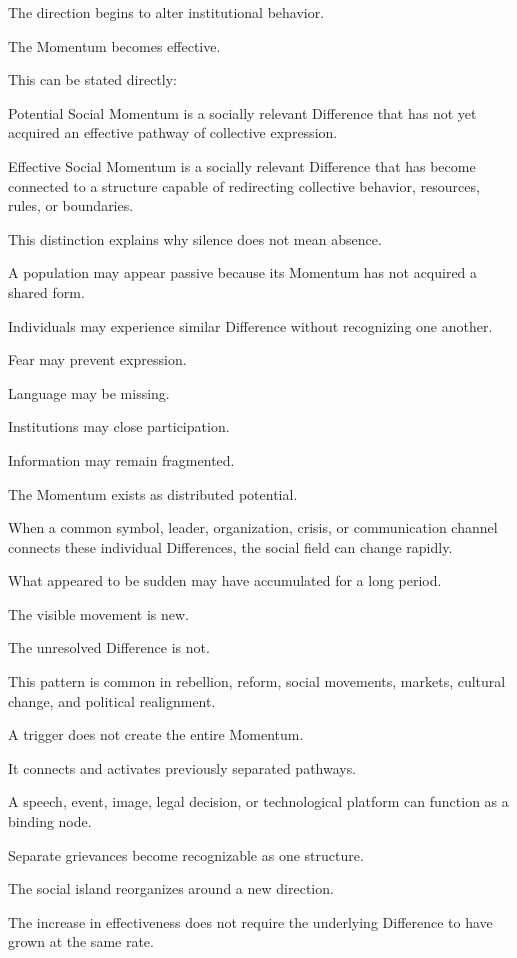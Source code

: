 The direction begins to alter institutional behavior.

The Momentum becomes effective.

This can be stated directly:

Potential Social Momentum is a socially relevant Difference that has not yet acquired an effective pathway of collective expression.

Effective Social Momentum is a socially relevant Difference that has become connected to a structure capable of redirecting collective behavior, resources, rules, or boundaries.

This distinction explains why silence does not mean absence.

A population may appear passive because its Momentum has not acquired a shared form.

Individuals may experience similar Difference without recognizing one another.

Fear may prevent expression.

Language may be missing.

Institutions may close participation.

Information may remain fragmented.

The Momentum exists as distributed potential.

When a common symbol, leader, organization, crisis, or communication channel connects these individual Differences, the social field can change rapidly.

What appeared to be sudden may have accumulated for a long period.

The visible movement is new.

The unresolved Difference is not.

This pattern is common in rebellion, reform, social movements, markets, cultural change, and political realignment.

A trigger does not create the entire Momentum.

It connects and activates previously separated pathways.

A speech, event, image, legal decision, or technological platform can function as a binding node.

Separate grievances become recognizable as one structure.

The social island reorganizes around a new direction.

The increase in effectiveness does not require the underlying Difference to have grown at the same rate.

